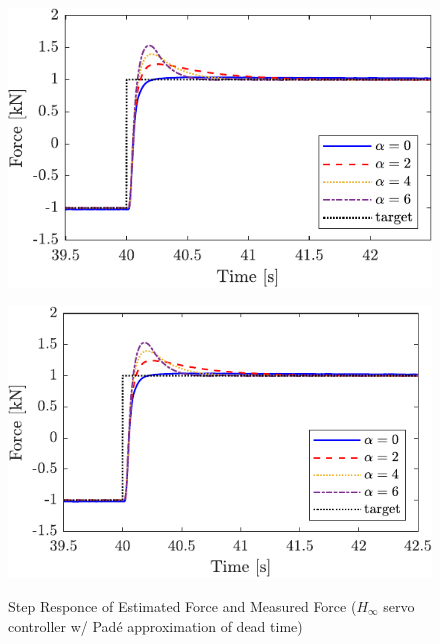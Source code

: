 \begin{figure}[t]
    \begin{minipage}{\minipageratio\hsize}
    \centering
        \includegraphics[keepaspectratio, scale = \minifigscale]{contents/ForceControl/figure/1115/crop-1115_JFPSHinf_estforcepade1_step.pdf}
        \label{fig4:crop-1115_JFPSHinf_estforcepade1_step}
    \end{minipage}
    \begin{minipage}{\minipageratio\hsize}
    \centering
        \includegraphics[keepaspectratio, scale = \minifigscale]{contents/ForceControl/figure/1115/crop-1115_JFPSHinf_forcepade1_step.pdf}
        \label{fig4:crop-1115_JFPSHinf_forcepade1_step}
    \end{minipage}
    \caption{Step Responce of Estimated Force and Measured Force ($H_\infty$ servo controller w/ Pad\'e approximation of dead time)}
    \label{fig4:crop-1115_JFPSHinfpade1_step}
\end{figure}

